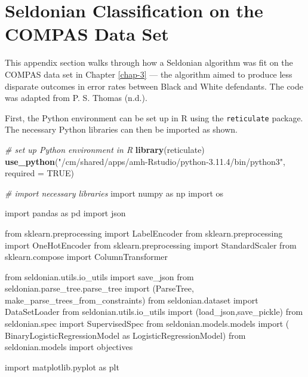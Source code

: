 \documentclass[12pt, twoside]{amherstthesis}
\newenvironment{Shaded}{\begin{snugshade}}{\end{snugshade}}
\newcommand{\AttributeTok}[1]{\textcolor[rgb]{0.13,0.29,0.53}{#1}}
\newcommand{\CommentTok}[1]{\textcolor[rgb]{0.56,0.35,0.01}{\textit{#1}}}
\newcommand{\ConstantTok}[1]{\textcolor[rgb]{0.56,0.35,0.01}{#1}}
\newcommand{\FunctionTok}[1]{\textcolor[rgb]{0.13,0.29,0.53}{\textbf{#1}}}
\newcommand{\ImportTok}[1]{#1}
\newcommand{\NormalTok}[1]{#1}
\newcommand{\StringTok}[1]{\textcolor[rgb]{0.31,0.60,0.02}{#1}}
\begin{document}
\hypertarget{appendix-e}{%
\chapter{Seldonian Classification on the COMPAS Data Set}\label{appendix-e}}

\noindent This appendix section walks through how a Seldonian algorithm was fit on the COMPAS data set in Chapter \ref{chap-3} --- the algorithm aimed to produce less disparate outcomes in error rates between Black and White defendants. The code was adapted from P. S. Thomas (n.d.).

\noindent First, the Python environment can be set up in R using the \texttt{reticulate} package. The necessary Python libraries can then be imported as shown.
\begin{Shaded}
\begin{Highlighting}[]
\CommentTok{\# set up Python environment in R}
\FunctionTok{library}\NormalTok{(reticulate)}
\FunctionTok{use\_python}\NormalTok{(}\StringTok{"/cm/shared/apps/amh{-}Rstudio/python{-}3.11.4/bin/python3"}\NormalTok{, }
           \AttributeTok{required =} \ConstantTok{TRUE}\NormalTok{)}
\end{Highlighting}
\end{Shaded}
\begin{Shaded}
\begin{Highlighting}[]
\CommentTok{\# import necessary libraries}
\ImportTok{import}\NormalTok{ numpy }\ImportTok{as}\NormalTok{ np}
\ImportTok{import}\NormalTok{ os}

\ImportTok{import}\NormalTok{ pandas }\ImportTok{as}\NormalTok{ pd}
\ImportTok{import}\NormalTok{ json}

\ImportTok{from}\NormalTok{ sklearn.preprocessing }\ImportTok{import}\NormalTok{ LabelEncoder}
\ImportTok{from}\NormalTok{ sklearn.preprocessing }\ImportTok{import}\NormalTok{ OneHotEncoder}
\ImportTok{from}\NormalTok{ sklearn.preprocessing }\ImportTok{import}\NormalTok{ StandardScaler}
\ImportTok{from}\NormalTok{ sklearn.compose }\ImportTok{import}\NormalTok{ ColumnTransformer}

\ImportTok{from}\NormalTok{ seldonian.utils.io\_utils }\ImportTok{import}\NormalTok{ save\_json}
\ImportTok{from}\NormalTok{ seldonian.parse\_tree.parse\_tree }\ImportTok{import}\NormalTok{ (ParseTree,}
\NormalTok{    make\_parse\_trees\_from\_constraints)}
\ImportTok{from}\NormalTok{ seldonian.dataset }\ImportTok{import}\NormalTok{ DataSetLoader}
\ImportTok{from}\NormalTok{ seldonian.utils.io\_utils }\ImportTok{import}\NormalTok{ (load\_json,save\_pickle)}
\ImportTok{from}\NormalTok{ seldonian.spec }\ImportTok{import}\NormalTok{ SupervisedSpec}
\ImportTok{from}\NormalTok{ seldonian.models.models }\ImportTok{import}\NormalTok{ (}
\NormalTok{    BinaryLogisticRegressionModel }\ImportTok{as}\NormalTok{ LogisticRegressionModel) }
\ImportTok{from}\NormalTok{ seldonian.models }\ImportTok{import}\NormalTok{ objectives}

\ImportTok{import}\NormalTok{ matplotlib.pyplot }\ImportTok{as}\NormalTok{ plt}
\end{Highlighting}
\end{Shaded}
\end{document}
